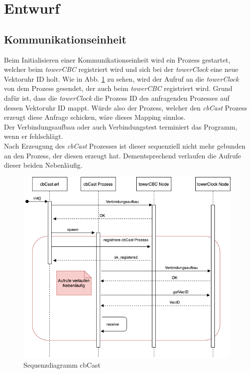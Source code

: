 \section{Entwurf}

\subsection{Kommunikationseinheit} \label{commModule}

Beim Initialisieren einer Kommunikationseinheit wird ein Prozess gestartet, welcher beim \textit{towerCBC} registriert wird und sich bei der \textit{towerClock} eine neue Vektoruhr ID holt. Wie in Abb. \ref{fig:sequence_cbCast} zu sehen, wird der Aufruf an die \textit{towerClock} von dem Prozess gesendet, der auch beim \textit{towerCBC} registriert wird. Grund dafür ist, dass die \textit{towerClock} die Prozess ID des anfragenden Prozesses auf dessen Vektoruhr ID mappt. Würde also der Prozess, welcher den \textit{cbCast} Prozess erzeugt diese Anfrage schicken, wäre dieses Mapping sinnlos.
\\Der Verbindungsaufbau oder auch Verbindungstest terminiert das Programm, wenn er fehlschlägt.
\\Nach Erzeugung des \textit{cbCast} Prozesses ist dieser sequenziell nicht mehr gebunden an den Prozess, der diesen erzeugt hat. Dementsprechend verlaufen die Aufrufe dieser beiden Nebenläufig.

\begin{figure}[htbp]
\begin{center}
\includegraphics[scale=0.7]{Latex/Bilder/Sequenzdiagramm_cbCast.png}
\caption{\label{fig:sequence_cbCast} Sequenzdiagramm cbCast}
\end{center}
\end{figure}

